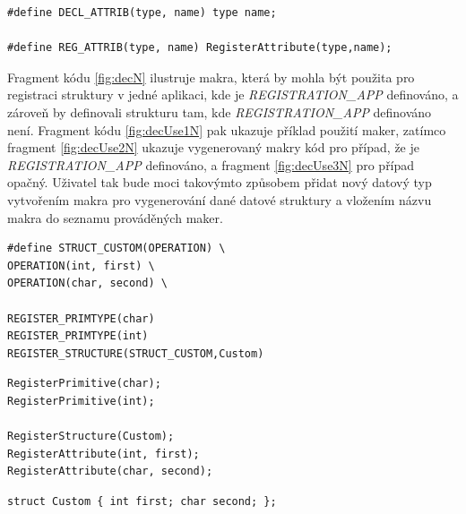 \documentclass[11pt,twoside,a4paper]{book}
\begin{document}
{{\begin{ttemize}
{{\begin{lstlisting}[frame=single,caption=Řešení v pseudokódu problematického použití operátoru "." v přiřazovacím výroku,label=lst:decN]
#define DECL_ATTRIB(type, name) type name;

#define REG_ATTRIB(type, name) RegisterAttribute(type,name);
\end{lstlisting}
  
Fragment kódu \ref{fig:decN} ilustruje makra, která by mohla být použita pro registraci struktury v jedné aplikaci, kde je \textit{REGISTRATION\_APP} definováno, a zároveň by definovali strukturu tam, kde \textit{REGISTRATION\_APP} definováno není. Fragment kódu \ref{fig:decUse1N} pak ukazuje příklad použití maker, zatímco fragment \ref{fig:decUse2N} ukazuje vygenerovaný makry kód pro případ, že je \textit{REGISTRATION\_APP} definováno, a fragment \ref{fig:decUse3N} pro případ opačný. Uživatel tak bude moci takovýmto způsobem přidat nový datový typ vytvořením makra pro vygenerování dané datové struktury a vložením názvu makra do seznamu prováděných maker.

\begin{lstlisting}[frame=single,caption=Řešení v pseudokódu problematického použití operátoru "." v přiřazovacím výroku,label=lst:decUse1N]
#define STRUCT_CUSTOM(OPERATION) \
OPERATION(int, first) \
OPERATION(char, second) \

REGISTER_PRIMTYPE(char)
REGISTER_PRIMTYPE(int)
REGISTER_STRUCTURE(STRUCT_CUSTOM,Custom)
\end{lstlisting}

\begin{lstlisting}[frame=single,caption=Řešení v pseudokódu problematického použití operátoru "." v přiřazovacím výroku,label=lst:decUse2N]
RegisterPrimitive(char);
RegisterPrimitive(int);

RegisterStructure(Custom);
RegisterAttribute(int, first);
RegisterAttribute(char, second);
\end{lstlisting}

\begin{lstlisting}[frame=single,caption=Řešení v pseudokódu problematického použití operátoru "." v přiřazovacím výroku,label=lst:decUse3N]
struct Custom { int first; char second; };
\end{lstlisting}
 







}}
\end{ttemize}}}
\end{document}
